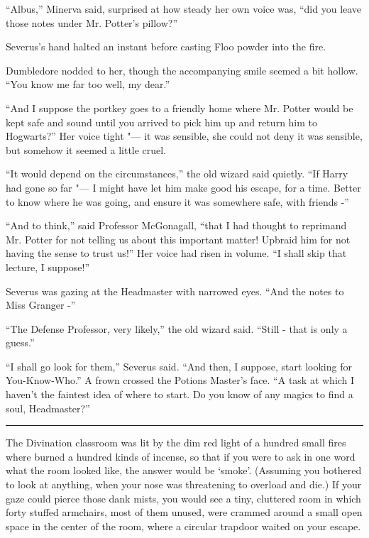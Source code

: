 ``Albus,'' Minerva said, surprised at how steady her own voice was,
``did you leave those notes under Mr. Potter's pillow?''

Severus's hand halted an instant before casting Floo powder into the
fire.

Dumbledore nodded to her, though the accompanying smile seemed a bit
hollow. ``You know me far too well, my dear.''

``And I suppose the portkey goes to a friendly home where Mr. Potter
would be kept safe and sound until you arrived to pick him up and return
him to Hogwarts?'' Her voice tight "--- it was sensible, she could not deny
it was sensible, but somehow it seemed a little cruel.

``It would depend on the circumstances,'' the old wizard said quietly.
``If Harry had gone so far "--- I might have let him make good his escape,
for a time. Better to know where he was going, and ensure it was
somewhere safe, with friends -''

``And to think,'' said Professor McGonagall, ``that I had thought to
reprimand Mr. Potter for not telling us about this important matter!
Upbraid him for not having the sense to trust us!'' Her voice had risen
in volume. ``I shall skip that lecture, I suppose!''

Severus was gazing at the Headmaster with narrowed eyes. ``And the notes
to Miss Granger -''

``The Defense Professor, very likely,'' the old wizard said. ``Still -
that is only a guess.''

``I shall go look for them,'' Severus said. ``And then, I suppose, start
looking for You-Know-Who.'' A frown crossed the Potions Master's face.
``A task at which I haven't the faintest idea of where to start. Do you
know of any magics to find a soul, Headmaster?''

\begin{center}\rule{3in}{0.4pt}\end{center}

The Divination classroom was lit by the dim red light of a hundred small
fires where burned a hundred kinds of incense, so that if you were to
ask in one word what the room looked like, the answer would be `smoke'.
(Assuming you bothered to look at anything, when your nose was
threatening to overload and die.) If your gaze could pierce those dank
mists, you would see a tiny, cluttered room in which forty stuffed
armchairs, most of them unused, were crammed around a small open space
in the center of the room, where a circular trapdoor waited on your
escape.

